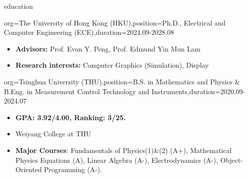 \documentclass{resume}
\begin{document}
\makeheader

\begin{ResumeSection}{education}
    \begin{ResumeSubsection}{org={The University of Hong Kong (HKU)},position={Ph.D., Electrical and Computer Engineering (ECE)},duration={2024.09-2028.08}}
        \begin{itemize}
            \item \textbf{Advisors:} Prof. Evan Y. Peng, Prof. Edmund Yin Mun Lam
            \item \textbf{Research interests:} Computer Graphics (Simulation), Display
        \end{itemize}
    \end{ResumeSubsection}
    \begin{ResumeSubsection}{org={Tsinghua University (THU)},position={B.S. in Mathematics and Physics \& B.Eng. in Measurement Control Technology and Instruments},duration={2020.09-2024.07}}
        \begin{itemize}
            \item \textbf{GPA: 3.92/4.00, Ranking: 3/25.}
            \item Weiyang College at THU
            \item \textbf{Major Courses}: Fundamentals of Physics(1)\&(2) (A+), Mathematical Physics Equations (A), Linear Algebra (A-), Electrodynamics (A-), Object-Oriented Programming (A-).
        \end{itemize}
    \end{ResumeSubsection}
\end{ResumeSection}
\vspace{-9pt}
\end{document}
